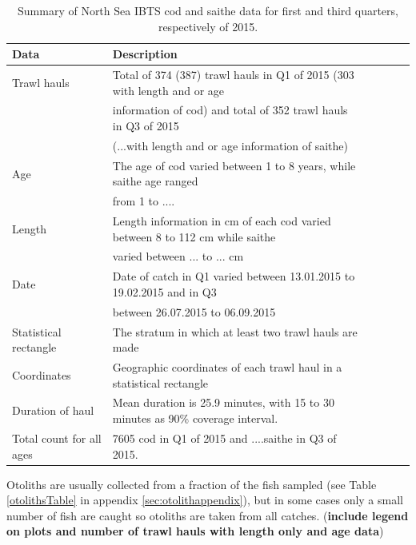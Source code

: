 \documentclass[a4paper 12pt]{article}
\numberwithin{equation}{section}
\begin{document}
\begin{small}
\begin{table}[h!]
\caption{Summary of North Sea IBTS cod and saithe data for first and third quarters, respectively of 2015.}
\begin{tabular}{llllll}
\toprule
\bf Data&\bf Description \\
\midrule
Trawl hauls  & Total of 374 (387) trawl hauls in Q1 of 2015 (303 with length and or age \\ 
& information of cod) and total of 352 trawl hauls in Q3 of 2015 \\
&(...with length and or age information of saithe) \\[1.5ex]
Age &The age of cod varied between 1 to 8 years, while saithe age ranged \\
& from 1 to .... \\[1.5ex]
Length & Length information in cm of each cod varied between 8 to 112 cm while saithe \\
& varied between ... to ... cm \\[1.5ex]
Date&Date of catch in Q1 varied between 13.01.2015 to 19.02.2015 and in Q3 \\
&between 26.07.2015 to 06.09.2015 \\[1.5ex]
Statistical rectangle & The stratum in  which at least two trawl hauls are made \\[1.5ex]
Coordinates & Geographic coordinates of each trawl haul in a statistical rectangle \\[1.5ex]
Duration of haul & Mean duration is 25.9 minutes, with 15  to 30 minutes as 90\% coverage interval. \\[1.5ex]
Total count for all ages & 7605 cod in Q1 of 2015 and ....saithe in Q3 of 2015. \\[0.5ex]
\bottomrule
\end{tabular}
\label{tab:data2015}
\end{table}
\end{small}

Otoliths are usually collected from a fraction of the fish sampled (see Table \ref{otolithsTable} in appendix \ref{sec:otolithappendix}), but in some cases only a small number of fish are caught so otoliths are taken from all catches. ({\bf include legend on plots and number of trawl hauls with length only and age data})
\end{document}
